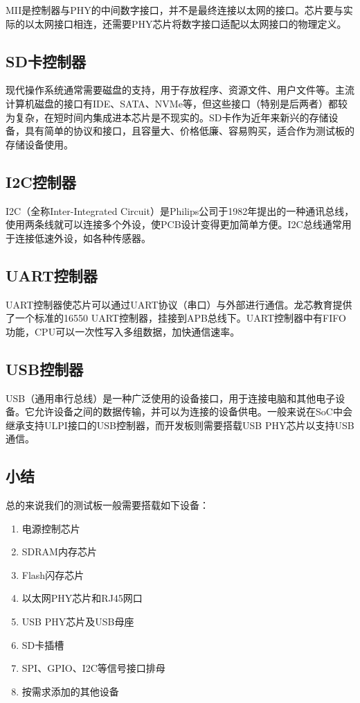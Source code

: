 MII是控制器与PHY的中间数字接口，并不是最终连接以太网的接口。芯片要与实际的以太网接口相连，还需要PHY芯片将数字接口适配以太网接口的物理定义。

\subsection{SD卡控制器}\label{sec:12-fpga-verification-009}

现代操作系统通常需要磁盘的支持，用于存放程序、资源文件、用户文件等。主流计算机磁盘的接口有IDE、SATA、NVMe等，但这些接口（特别是后两者）都较为复杂，在短时间内集成进本芯片是不现实的。SD卡作为近年来新兴的存储设备，具有简单的协议和接口，且容量大、价格低廉、容易购买，适合作为测试板的存储设备使用。

\subsection{I2C控制器}\label{sec:12-fpga-verification-010}

I2C（全称Inter-Integrated Circuit）是Philips公司于1982年提出的一种通讯总线，使用两条线就可以连接多个外设，使PCB设计变得更加简单方便。I2C总线通常用于连接低速外设，如各种传感器。

\subsection{UART控制器}\label{sec:12-fpga-verification-011}

UART控制器使芯片可以通过UART协议（串口）与外部进行通信。龙芯教育提供了一个标准的16550 UART控制器，挂接到APB总线下。UART控制器中有FIFO功能，CPU可以一次性写入多组数据，加快通信速率。

\subsection{USB控制器}\label{sec:12-fpga-verification-012}

USB（通用串行总线）是一种广泛使用的设备接口，用于连接电脑和其他电子设备。它允许设备之间的数据传输，并可以为连接的设备供电。一般来说在SoC中会继承支持ULPI接口的USB控制器，而开发板则需要搭载USB PHY芯片以支持USB通信。

\subsection{小结}\label{sec:12-fpga-verification-013}

总的来说我们的测试板一般需要搭载如下设备：

\begin{enumerate}
\def\labelenumi{\arabic{enumi}.}
\tightlist
\item
  电源控制芯片
\item
  SDRAM内存芯片
\item
  Flash闪存芯片
\item
  以太网PHY芯片和RJ45网口
\item
  USB PHY芯片及USB母座
\item
  SD卡插槽
\item
  SPI、GPIO、I2C等信号接口排母
\item
  按需求添加的其他设备
\end{enumerate}
